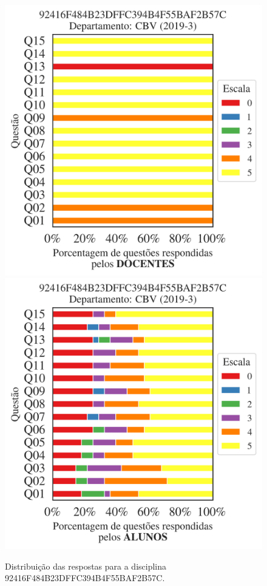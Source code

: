 \documentclass[a4paper,10pt]{article}
\begin{document}
\begin{figure}[h]
\centering
\includegraphics[width=0.485\linewidth]{analise_disciplina_departamento_CBV_92416F484B23DFFC394B4F55BAF2B57C_docentes.png}
\includegraphics[width=0.485\linewidth]{analise_disciplina_departamento_CBV_92416F484B23DFFC394B4F55BAF2B57C_alunos.png}
\caption{\label{fig:analise_geral_departamento}                Distribuição das respostas para a disciplina 92416F484B23DFFC394B4F55BAF2B57C. }
\end{figure}
\end{document}
